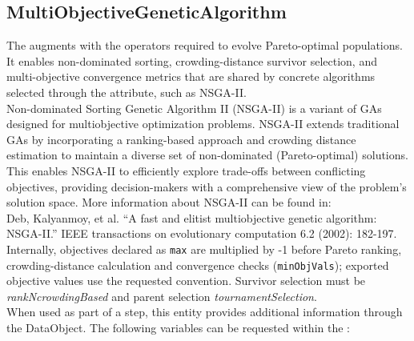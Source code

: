 \subsection{MultiObjectiveGeneticAlgorithm}
  The  augments  with the
  operators required to evolve Pareto-optimal populations. It enables non-dominated sorting,
  crowding-distance survivor selection, and multi-objective convergence metrics that are shared
  by concrete algorithms selected through the  attribute, such as NSGA-II.\\
  Non-dominated Sorting Genetic Algorithm II (NSGA-II) is a variant of GAs designed for
  multiobjective optimization problems.                             NSGA-II extends traditional GAs
  by incorporating a ranking-based approach and crowding distance estimation to maintain a diverse
  set of                             non-dominated (Pareto-optimal) solutions. This enables NSGA-II
  to efficiently explore trade-offs between conflicting objectives,
  providing decision-makers with a comprehensive view of the problem's solution space. More
  information about NSGA-II can be found in:\\                              Deb, Kalyanmoy, et al.
  ``A fast and elitist multiobjective genetic algorithm: NSGA-II.'' IEEE transactions on
  evolutionary computation 6.2 (2002): 182-197.\\                              Internally,
  objectives declared as \texttt{max} are multiplied by -1 before Pareto ranking, crowding-distance
  calculation and convergence checks (\texttt{minObjVals}); exported objective values use the
  requested convention.                             Survivor selection must be
  \textit{rankNcrowdingBased} and parent selection \textit{tournamentSelection}.
\vspace{7pt} \\When used as part of a  step, this entity provides
        additional information through the  DataObject. The
        following variables can be requested within the :
